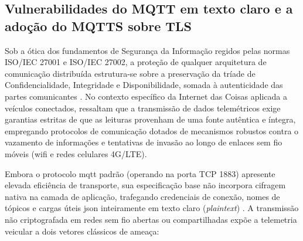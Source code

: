 \documentclass[
	12pt,				%
	openright,			%
	twoside,			%
	a4paper,			%
	english,			%
	brazil				%
	]{abntex2}
\begin{document}
\subsection{Vulnerabilidades do MQTT em texto claro e a adoção do MQTTS sobre
TLS}\label{sec:vulnerabilidades_mqtt}

Sob a ótica dos fundamentos de Segurança da Informação regidos pelas normas ISO/IEC
27001 e ISO/IEC 27002, a proteção de qualquer arquitetura de comunicação distribuída
estrutura-se sobre a preservação da tríade de Confidencialidade, Integridade e
Disponibilidade, somada à autenticidade das partes comunicantes \cite{baars2018}. No
contexto específico da Internet das Coisas aplicada a veículos conectados,
 ressaltam que a transmissão de dados telemétricos exige garantias
estritas de que as leituras provenham de uma fonte autêntica e íntegra, empregando
protocolos de comunicação dotados de mecanismos robustos contra o vazamento de
informações e tentativas de invasão ao longo de enlaces sem fio móveis (\acrshort{wifi}
e redes celulares 4G/LTE).

Embora o protocolo \acrshort{mqtt} padrão (operando na porta TCP 1883) apresente elevada
eficiência de transporte, sua especificação base não incorpora cifragem nativa na camada
de aplicação, trafegando credenciais de conexão, nomes de tópicos e cargas úteis
\acrshort{json} inteiramente em texto claro (\textit{plaintext}) \cite{oasis2014}. A
transmissão não criptografada em redes sem fio abertas ou compartilhadas expõe a
telemetria veicular a dois vetores clássicos de ameaça:
\end{document}
